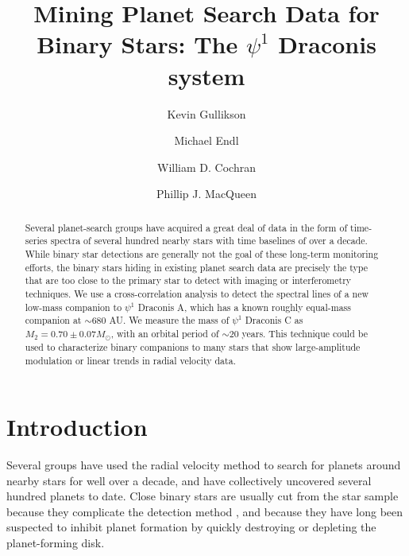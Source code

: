 \documentclass[twocolumn]{emulateapj}
\begin{document}
\title{Mining Planet Search Data for Binary Stars: The $\psi^1$ Draconis system}
\author{Kevin Gullikson }
\author{Michael Endl }
\author{William D. Cochran }
\author{Phillip J. MacQueen }




\begin{abstract}
Several planet-search groups have acquired a great deal of data in the form of time-series spectra of several hundred nearby stars with time baselines of over a decade. While binary star detections are generally not the goal of these long-term monitoring efforts, the binary stars hiding in existing planet search data are precisely the type that are too close to the primary star to detect with imaging or interferometry techniques. We use a cross-correlation analysis to detect the spectral lines of a new low-mass companion to $\psi^1$ Draconis A, which has a known roughly equal-mass companion at ${\sim}680$ AU. We measure the mass of $\psi^1$ Draconis C as $M_2 = 0.70 \pm 0.07 M_{\odot}$, with an orbital period of ${\sim}20$ years. This technique could be used to characterize binary companions to many stars that show large-amplitude modulation or linear trends in radial velocity data.
\end{abstract}

\maketitle

\section{Introduction}
\label{sec:intro}
Several groups \citep[e.g.][]{Wittenmyer2006, Fischer2009, Pepe2011} have used the radial velocity method to search for planets around nearby stars for well over a decade, and have collectively uncovered several hundred planets to date. Close binary stars are usually cut from the star sample because they complicate the detection method \citep[e.g.][]{Bergmann2015}, and because they have long been suspected to inhibit planet formation by quickly destroying \citep{Kraus2012} or depleting \citep{Harris2012} the planet-forming disk.
\end{document}
